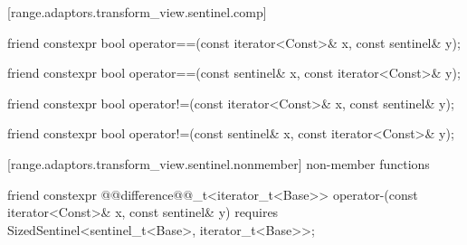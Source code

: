 {[range.adaptors.transform_view.sentinel.comp]{}

\begin{itemdecl}
friend constexpr bool operator==(const iterator<Const>& x, const sentinel& y);
\end{itemdecl}

\begin{itemdescr}
\pnum
\oldtxt{\returns} 
\end{itemdescr}

\begin{itemdecl}
friend constexpr bool operator==(const sentinel& x, const iterator<Const>& y);
\end{itemdecl}

\begin{itemdescr}
\pnum
\oldtxt{\returns} 
\end{itemdescr}

%
\begin{itemdecl}
friend constexpr bool operator!=(const iterator<Const>& x, const sentinel& y);
\end{itemdecl}

\begin{itemdescr}
\pnum
\oldtxt{\returns} 
\end{itemdescr}

%
\begin{itemdecl}
friend constexpr bool operator!=(const sentinel& x, const iterator<Const>& y);
\end{itemdecl}

\begin{itemdescr}
\pnum
\oldtxt{\returns} 
\end{itemdescr}

[range.adaptors.transform_view.sentinel.nonmember]{ non-member functions}

%
\begin{itemdecl}
friend constexpr @@difference@@_t<iterator_t<Base>>
operator-(const iterator<Const>& x, const sentinel& y)
  requires SizedSentinel<sentinel_t<Base>, iterator_t<Base>>;
\end{itemdecl}

}
